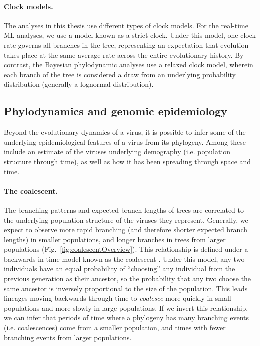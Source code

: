 \paragraph*{Clock models.}
The analyses in this thesis use different types of clock models.
For the real-time ML analyses, we use a model known as a strict clock.
Under this model, one clock rate governs all branches in the tree, representing an expectation that evolution takes place at the same average rate across the entire evolutionary history.
By contrast, the Bayesian phylodynamic analyses use a relaxed clock model, wherein each branch of the tree is considered a draw from an underlying probability distribution (generally a lognormal distribution).

\subsection{Phylodynamics and genomic epidemiology}\label{ssec:phylodynamics}
Beyond the evolutionary dynamics of a virus, it is possible to infer some of the underlying epidemiological features of a virus from its phylogeny.
Among these include an estimate of the viruses underlying demography (i.e. population structure through time), as well as how it has been spreading through space and time.

\paragraph*{The coalescent.}
The branching patterns and expected branch lengths of trees are correlated to the underlying population structure of the viruses they represent.
Generally, we expect to observe more rapid branching (and therefore shorter expected branch lengths) in smaller populations, and longer branches in trees from larger populations (Fig.~\ref{fig:coalescentOverview}).
This relationship is defined under a backwards-in-time model known as the coalescent \citep{kingman1982coalescent,kingman1982genealogy}.
Under this model, any two individuals have an equal probability of ``choosing'' any individual from the previous generation as their ancestor, so the probability that any two choose the same ancestor is inversely proportional to the size of the population.
This leads lineages moving backwards through time to \textit{coalesce} more quickly in small populations and more slowly in large populations.
If we invert this relationship, we can infer that periods of time where a phylogeny has many branching events (i.e. coalescences) come from a smaller population, and times with fewer branching events from larger populations.

